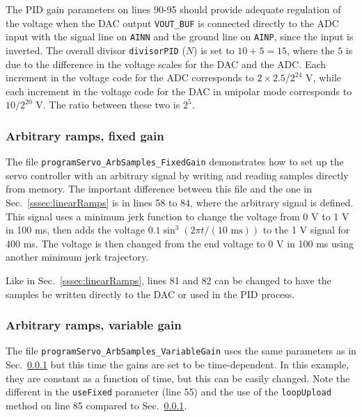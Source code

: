 \documentclass{article}
\begin{document}
The PID gain parameters on lines 90-95 should provide adequate regulation of the voltage when the DAC output \verb|VOUT_BUF| is connected directly to the ADC input with the signal line on \verb|AINN| and the ground line on \verb|AINP|, since the input is inverted.  The overall divisor \verb|divisorPID| ($N$) is set to $10+5=15$, where the $5$ is due to the difference in the voltage scales for the DAC and the ADC.  Each increment in the voltage code for the ADC corresponds to $2\times2.5/2^{24}$ V, while each increment in the voltage code for the DAC in unipolar mode corresponds to $10/2^{20}$ V.  The ratio between these two is $2^5$.

\subsubsection{Arbitrary ramps, fixed gain}
\label{sssec:arbRamps}
The file \verb|programServo_ArbSamples_FixedGain| demonstrates how to set up the servo controller with an arbitrary signal by writing and reading samples directly from memory.  The important difference between this file and the one in Sec.~\ref{sssec:linearRamps} is in lines 58 to 84, where the arbitrary signal is defined.  This signal uses a minimum jerk function to change the voltage from 0 V to 1 V in 100 ms, then adds the voltage $0.1\sin^3\left(2\pi t/(10\text{ ms})\right)$ to the 1 V signal for 400 ms.  The voltage is then changed from the end voltage to 0 V in 100 ms using another minimum jerk trajectory.

Like in Sec.~\ref{sssec:linearRamps}, lines 81 and 82 can be changed to have the samples be written directly to the DAC or used in the PID process.


\subsubsection{Arbitrary ramps, variable gain}
\label{sssec:arbRampsVariableGain}
The file \verb|programServo_ArbSamples_VariableGain| uses the same parameters as in Sec.~\ref{sssec:arbRamps} but this time the gains are set to be time-dependent.  In this example, they are constant as a function of time, but this can be easily changed.  Note the different in the \verb|useFixed| parameter (line 55) and the use of the \verb|loopUpload| method on line 85 compared to Sec.~\ref{sssec:arbRamps}.
\end{document}

